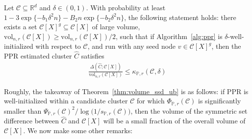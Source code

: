 \documentclass[11pt,twoside]{article}
\newcommand{\Reals}{\mathbb{R}}
\newcommand{\1}{\mathbf{1}}
\newcommand{\Rd}{\Reals^d}
\newcommand{\mc}[1]{\mathcal{#1}}
\newcommand{\Pbb}{\mathbb{P}}
\newcommand{\wh}[1]{\widehat{#1}}
\newcommand{\vol}{\mathrm{vol}}
\begin{document}
\begin{theorem}
	\label{thm:volume_ssd_ub} 
	Let $\mc{C} \subseteq \Rd$ and $\delta \in (0,1)$. With probability at least $1 - 3\exp\{-b_1\delta^2 n\} - B_2n\exp\{-b_2\delta^2n\}$, the following statement holds: there exists a set $\mc{C}[X]^g \subseteq \mc{C}[X]$ of large volume, $\vol_{n,r}(\mc{C}[X]) \geq \vol_{n,r}(\mc{C}[X])/2$, such that if Algorithm~\ref{alg:ppr} is $\delta$-well-initialized with respect to $\mc{C}$, and run with any seed node $v \in \mc{C}[X]^g$, then the PPR estimated cluster $\wh{C}$ satisfies
	\begin{equation}
	\label{eqn:volume_ssd_ub}
	\begin{aligned}
	\frac{\Delta(\wh{C};\mc{C}[X])}{\vol_{n,r}(\mc{C}[X])} \leq \kappa_{\Pbb,r}(\mc{C},\delta)
	\end{aligned}
	\end{equation}
\end{theorem}
Roughly, the takeaway of Theorem~\ref{thm:volume_ssd_ub} is as follows: if PPR is well-initialized within a candidate cluster $\mc{C}$ for which $\Phi_{\Pbb,r}(\mc{C})$ is significantly smaller than $\Psi_{\Pbb,r}(\mc{C})^2/\log\bigl(1/s_{\Pbb,r}(\mc{C})\bigr)$, then the volume of the symmetric set difference between $\wh{C}$ and $\mc{C}[X]$ will be a small fraction of the overall volume of $\mc{C}[X]$. We now make some other remarks:
\end{document}
